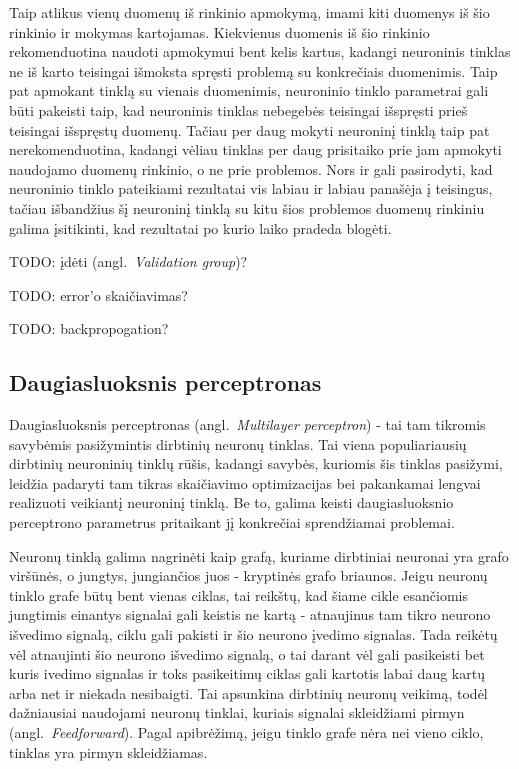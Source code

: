\documentclass{VUMIFPSbakalaurinis}
\newcommand{\TODO}[1]{
\colorbox{todo-background-color}{TODO: #1}
}
\begin{document}
Taip atlikus vienų duomenų iš rinkinio apmokymą, imami kiti duomenys iš šio rinkinio ir mokymas kartojamas.
Kiekvienus duomenis iš šio rinkinio rekomenduotina naudoti apmokymui bent kelis kartus, kadangi neuroninis tinklas ne iš karto teisingai išmoksta spręsti problemą su konkrečiais duomenimis.
Taip pat apmokant tinklą su vienais duomenimis, neuroninio tinklo parametrai gali būti pakeisti taip, kad neuroninis tinklas nebegebės teisingai išspręsti prieš teisingai išspręstų duomenų.
Tačiau per daug mokyti neuroninį tinklą taip pat nerekomenduotina, kadangi vėliau tinklas per daug prisitaiko prie jam apmokyti naudojamo duomenų rinkinio, o ne prie problemos.
Nors ir gali pasirodyti, kad neuroninio tinklo pateikiami rezultatai vis labiau ir labiau panašėja į teisingus, tačiau išbandžius šį neuroninį tinklą su kitu šios problemos duomenų rinkiniu galima įsitikinti, kad rezultatai po kurio laiko pradeda blogėti.
\TODO{įdėti (angl.~\textit{Validation group})?}

\TODO{error'o skaičiavimas?}

\TODO{backpropogation?}

\subsection{Daugiasluoksnis perceptronas}

Daugiasluoksnis perceptronas (angl.~\textit{Multilayer perceptron}) - tai tam tikromis savybėmis pasižymintis dirbtinių neuronų tinklas.
Tai viena populiariausių dirbtinių neuroninių tinklų rūšis, kadangi savybės, kuriomis šis tinklas pasižymi, leidžia padaryti tam tikras skaičiavimo optimizacijas bei pakankamai lengvai realizuoti veikiantį neuroninį tinklą.
Be to, galima keisti daugiasluoksnio perceptrono parametrus pritaikant jį konkrečiai sprendžiamai problemai.

Neuronų tinklą galima nagrinėti kaip grafą, kuriame dirbtiniai neuronai yra grafo viršūnės, o jungtys, jungiančios juos - kryptinės grafo briaunos.
Jeigu neuronų tinklo grafe būtų bent vienas ciklas, tai reikštų, kad šiame cikle esančiomis jungtimis einantys signalai gali keistis ne kartą - atnaujinus tam tikro neurono išvedimo signalą, ciklu gali pakisti ir šio neurono įvedimo signalas.
Tada reikėtų vėl atnaujinti šio neurono išvedimo signalą, o tai darant vėl gali pasikeisti bet kuris ivedimo signalas ir toks pasikeitimų ciklas gali kartotis labai daug kartų arba net ir niekada nesibaigti.
Tai apsunkina dirbtinių neuronų veikimą, todėl dažniausiai naudojami neuronų tinklai, kuriais signalai skleidžiami pirmyn (angl.~\textit{Feedforward}).
Pagal apibrėžimą, jeigu tinklo grafe nėra nei vieno ciklo, tinklas yra pirmyn skleidžiamas.
\end{document}
